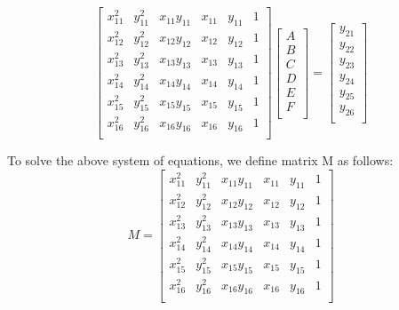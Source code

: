 \documentclass{article}
\begin{document}
\begin{enumerate}
\begin{equation}
     \begin{bmatrix}
        x_{11}^2 & y_{11}^2 & x_{11}y_{11} & x_{11} & y_{11} & 1\\
        x_{12}^2 & y_{12}^2 & x_{12}y_{12} & x_{12} & y_{12} & 1\\
        x_{13}^2 & y_{13}^2 & x_{13}y_{13} & x_{13} & y_{13} & 1\\
        x_{14}^2 & y_{14}^2 & x_{14}y_{14} & x_{14} & y_{14} & 1\\
        x_{15}^2 & y_{15}^2 & x_{15}y_{15} & x_{15} & y_{15} & 1\\
        x_{16}^2 & y_{16}^2 & x_{16}y_{16} & x_{16} & y_{16} & 1\\
    \end{bmatrix}
    \begin{bmatrix}
    A \\
    B \\
    C \\
    D \\
    E \\
    F \\
    \end{bmatrix}
          =
    \begin{bmatrix}
    y_{21} \\
    y_{22} \\
    y_{23} \\
    y_{24} \\
    y_{25} \\
    y_{26} \\
    \end{bmatrix}
\end{equation}

To solve the above system of equations, we define matrix M as follows:
\begin{equation}
 M = 
     \begin{bmatrix}
        x_{11}^2 & y_{11}^2 & x_{11}y_{11} & x_{11} & y_{11} & 1\\
        x_{12}^2 & y_{12}^2 & x_{12}y_{12} & x_{12} & y_{12} & 1\\
        x_{13}^2 & y_{13}^2 & x_{13}y_{13} & x_{13} & y_{13} & 1\\
        x_{14}^2 & y_{14}^2 & x_{14}y_{14} & x_{14} & y_{14} & 1\\
        x_{15}^2 & y_{15}^2 & x_{15}y_{15} & x_{15} & y_{15} & 1\\
        x_{16}^2 & y_{16}^2 & x_{16}y_{16} & x_{16} & y_{16} & 1\\
    \end{bmatrix}
\end{equation}


\end{enumerate}
\end{document}
